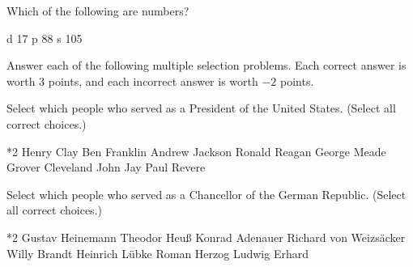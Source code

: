\documentclass{article}
\begin{document}
\begin{qzbody1}
\begin{quiz*}{\currQuiz}
\begin{questions}
\begin{rtVW}
\item{} Which of the following are numbers?
\begin{manswers}{6}
\bChoices[random=true]
  d\eAns
  17\eAns
  p\eAns
  88\eAns
  s\eAns
  105\eAns
\eChoices
\end{manswers}
\end{rtVW}


\begin{rtVW}
\multipartquestion
    \item{} Answer each of the following multiple selection problems. Each correct answer
    is worth $3$ points, and each incorrect answer is worth $-2$ points.
    \begin{questions}

\rowsep{3pt}

        \item{} Select which people who served as a President
                     of the United States. (Select all correct choices.)

        \begin{manswers}*{2}%
            \bChoices[random=true]
                 Henry Clay\eAns
                 Ben Franklin\eAns
                  Andrew Jackson\eAns
                  Ronald Reagan\eAns
                 George Meade\eAns
                  Grover Cleveland\eAns
                 John Jay\eAns
                 Paul Revere\eAns
            \eChoices
        \end{manswers}

\rowsep{3pt}

        \item{} Select which people who served as a Chancellor of the
            German Republic. (Select all correct choices.)
        \begin{manswers}*{2}%
            \bChoices[nCols=2,random=true]
                 Gustav Heinemann\eAns
                 Theodor Heu{\ss}\eAns
                  Konrad Adenauer\eAns
                 Richard von Weizs\"{a}cker\eAns
                  Willy Brandt\eAns
                 Heinrich L\"{u}bke\eAns
                 Roman Herzog\eAns
                 Ludwig Erhard\eAns
            \eChoices
        \end{manswers}


\end{questions}
\end{rtVW}
\end{questions}
\end{quiz*}
\end{qzbody1}
\end{document}
